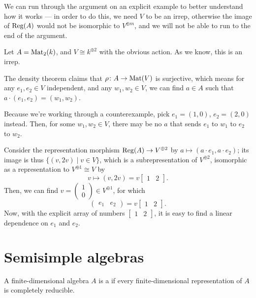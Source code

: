 \begin{example}
	We can run through the argument on an explicit example to better understand
	how it works --- in order to do this, we need $V$ to be an irrep,
	otherwise the image of $\operatorname{Reg}(A)$ would not be isomorphic to $V^{\oplus m}$,
	and we will not be able to run to the end of the argument.

	Let $A=\mathrm{Mat}_2(k)$, and $V \cong k^{\oplus 2}$ with the obvious action.
	As we know, this is an irrep.

	The density theorem claims that $\rho \colon A \to \mathrm{Mat}(V)$ is surjective, which
	means for any $e_1, e_2 \in V$ independent, and any $w_1, w_2 \in V$, we can
	find $a \in A$ such that $a \cdot (e_1, e_2) = (w_1, w_2)$.

	Because we're working through a counterexample, pick $e_1=(1, 0)$, $e_2=(2, 0)$ instead.
	Then, for some $w_1, w_2 \in V$,
	there may be no $a$ that sends $e_1$ to $w_1$ to $e_2$ to $w_2$.

	Consider the representation morphism $\operatorname{Reg}(A) \to V^{\oplus 2}$ by
	$a \mapsto(a \cdot e_1, a \cdot e_2)$;
	its image is thus $\{(v, 2v) \mid v \in V \}$,
	which is a subrepresentation of $V^{\oplus 2}$,
	isomorphic as a representation to $V^{\oplus 1}\cong V$ by
	\[ v \mapsto(v, 2v) = v \begin{bmatrix} 1 & 2 \end{bmatrix}. \]
	Then, we can find $v=\begin{pmatrix}1 \\ 0\end{pmatrix}\in V^{\oplus 1}$,
	for which
	\[ \begin{pmatrix} e_1 & e_2 \end{pmatrix} = v \begin{bmatrix} 1 & 2 \end{bmatrix}. \]
	Now, with the explicit array of numbers $\begin{bmatrix} 1 & 2 \end{bmatrix}$,
	it is easy to find a linear dependence on $e_1$ and $e_2$.
\end{example}

\section{Semisimple algebras}
\begin{definition}
	A finite-dimensional algebra $A$ is a 
	if every finite-dimensional representation of $A$ is completely reducible.
\end{definition}

